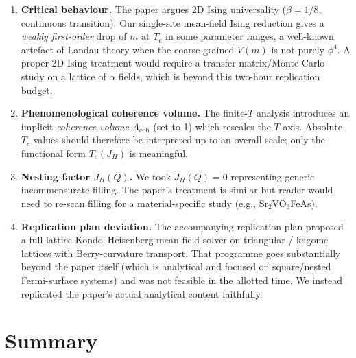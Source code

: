 \documentclass[11pt]{article}
\begin{document}
\begin{enumerate}
\item \textbf{Critical behaviour.} The paper argues 2D Ising universality
($\beta=1/8$, continuous transition). Our single-site mean-field Ising
reduction gives a \emph{weakly first-order} drop of $m$ at $T_c$ in some
parameter ranges, a well-known artefact of Landau theory when the coarse-grained
$V(m)$ is not purely $\phi^4$. A proper 2D Ising treatment would require a
transfer-matrix/Monte Carlo study on a lattice of $\alpha$ fields, which is
beyond this two-hour replication budget.
\item \textbf{Phenomenological coherence volume.} The finite-$T$ analysis
introduces an implicit \emph{coherence volume} $A_{\text{coh}}$ (set to 1)
which rescales the $T$ axis. Absolute $T_c$ values should therefore be
interpreted up to an overall scale; only the functional form $T_c(J_H)$ is
meaningful.
\item \textbf{Nesting factor $\tilde J_H(Q)$.} We took $\tilde J_H(Q)=0$
representing generic incommensurate filling. The paper's treatment is
similar but reader would need to re-scan filling for a material-specific
study (e.g., Sr$_2$VO$_3$FeAs).
\item \textbf{Replication plan deviation.} The accompanying replication plan
proposed a full lattice Kondo--Heisenberg mean-field solver on triangular /
kagome lattices with Berry-curvature transport. That programme goes
substantially beyond the paper itself (which is analytical and focused on
square/nested Fermi-surface systems) and was not feasible in the allotted
time. We instead replicated the paper's actual analytical content faithfully.
\end{enumerate}

\section{Summary}
\end{document}
